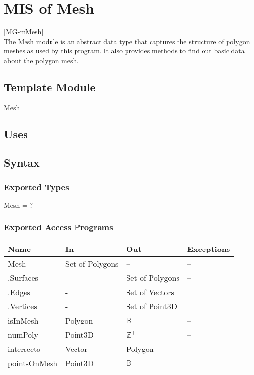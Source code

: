 \documentclass[12pt, titlepage]{article}
\begin{document}
\newpage


\section{MIS of Mesh} \ref{MG-mMesh} \\
The Mesh module is an abstract data type that captures the structure of polygon 
meshes as used by this program. It also provides methods to find out basic data 
about the polygon mesh.

\subsection{Template Module}
Mesh

\subsection{Uses}

\subsection{Syntax}
\subsubsection{Exported Types}
Mesh = ?

\subsubsection{Exported Access Programs}
\begin{center}
	\begin{tabular}{p{2cm} p{4cm} p{4cm} p{2cm}}
		\hline
		\textbf{Name} & \textbf{In} & \textbf{Out} & \textbf{Exceptions} \\
		\hline
		Mesh & Set of Polygons & -- & -- \\
		.Surfaces & - & Set of Polygons & -- \\
		.Edges & - & Set of Vectors & -- \\
		.Vertices & - & Set of Point3D & -- \\
		isInMesh & Polygon & $\mathbb{B}$ & -- \\ %
		numPoly & Point3D & $\mathbb{Z^+}$ & -- \\ %
		intersects & Vector & Polygon & -- \\ %
		pointsOnMesh & Point3D & $\mathbb{B}$ & -- \\
		\hline
	\end{tabular}
\end{center}
\end{document}

